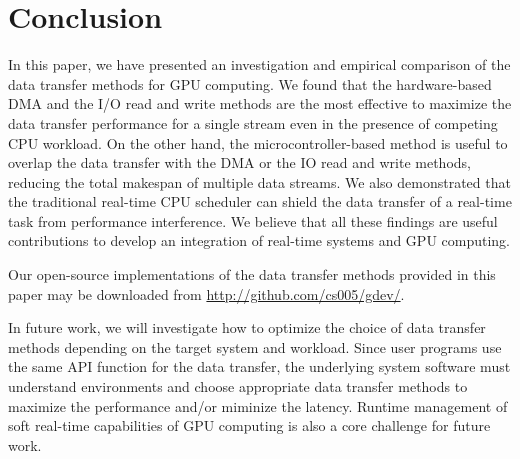 \section{Conclusion}
\label{sec:conclusion}

In this paper, we have presented an investigation and empirical
comparison of the data transfer methods for GPU computing.
We found that the hardware-based DMA and the I/O read and write methods
are the most effective to maximize the data transfer performance for a
single stream even in the presence of competing CPU workload.
On the other hand, the microcontroller-based method is useful to overlap
the data transfer with the DMA or the IO read and write methods,
reducing the total makespan of multiple data streams.
We also demonstrated that the traditional real-time CPU scheduler can
shield the data transfer of a real-time task from performance
interference.
We believe that all these findings are useful contributions to develop
an integration of real-time systems and GPU computing.

Our open-source implementations of the data transfer methods
provided in this paper may be downloaded from
\url{http://github.com/cs005/gdev/}.

In future work, we will investigate how to optimize the choice of data
transfer methods depending on the target system and workload.
Since user programs use the same API function for the data transfer, the
underlying system software must understand environments and choose
appropriate data transfer methods to maximize the performance and/or
miminize the latency.
Runtime management of soft real-time capabilities of GPU computing is
also a core challenge for future work.